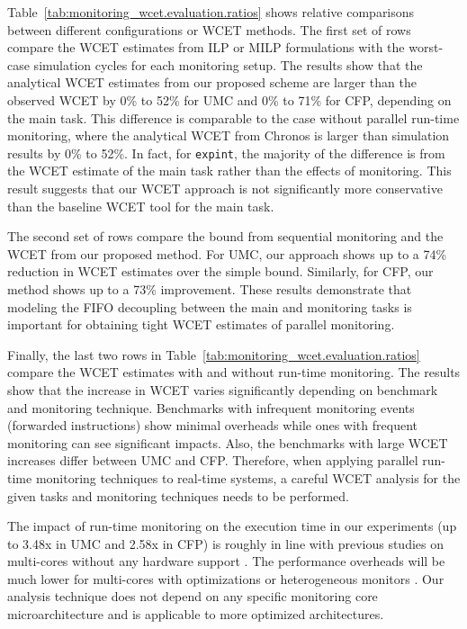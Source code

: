 Table~\ref{tab:monitoring_wcet.evaluation.ratios} shows relative comparisons between
different configurations or WCET methods.
The first set of rows compare the WCET estimates from ILP or MILP formulations
with the worst-case simulation cycles for each monitoring setup. 
The results show that the analytical WCET estimates from our proposed scheme
are larger than the observed WCET by 0\% to 52\% for UMC and 0\% to 71\% for CFP, 
depending on the main task. This difference is comparable to the case without
parallel run-time monitoring, where the analytical WCET from Chronos
is larger than simulation results by 0\% to 52\%. 
In fact, for {\tt expint}, the majority of the difference is from the WCET
estimate of the main task rather than the effects of monitoring.
This result suggests that our WCET approach is not significantly more conservative than
the baseline WCET tool for the main task.

The second set of rows compare the bound from sequential monitoring and the WCET 
from our proposed method. 
For UMC, our approach shows up to a 74\% reduction in WCET estimates over the simple
bound. Similarly, for CFP, our method shows up to a 73\% improvement.
These results demonstrate that modeling the FIFO decoupling between the main and monitoring
tasks is important for obtaining tight WCET estimates of parallel
monitoring. 

Finally, the last two rows in Table~\ref{tab:monitoring_wcet.evaluation.ratios} compare the WCET 
estimates with and without run-time monitoring.
The results show that the increase in WCET varies significantly depending on
benchmark and monitoring technique. Benchmarks with infrequent monitoring
events (forwarded instructions) show minimal overheads while ones with frequent
monitoring can see significant impacts.
Also, the benchmarks with large WCET increases differ between UMC and CFP.
Therefore, when applying parallel run-time monitoring techniques to real-time systems,
a careful WCET analysis for the given tasks and monitoring techniques 
needs to be performed. 

The impact of run-time monitoring on the execution time in our experiments
(up to 3.48x in UMC and 2.58x in CFP) is roughly in line with previous studies
on multi-cores without any hardware support \cite{chen08-lba, nagarajan08-dift}. 
The performance overheads will be much lower for multi-cores with optimizations 
\cite{chen08-lba} or heterogeneous monitors \cite{flexcore-micro10}. 
Our analysis technique does not depend on any specific monitoring core
microarchitecture and is applicable to more optimized architectures.

